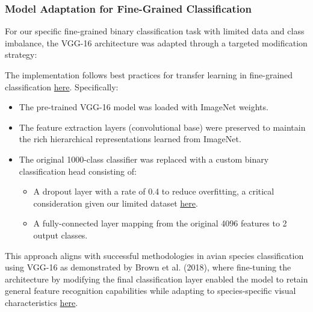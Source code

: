 \documentclass[a4paper,12pt]{article}
\begin{document}
\subsubsection{Model Adaptation for Fine-Grained Classification}
For our specific fine-grained binary classification task with limited data and class imbalance, the VGG-16 architecture was adapted through a targeted modification strategy:



The implementation follows best practices for transfer learning in fine-grained classification \href{https://openaccess.thecvf.com/content_CVPR_2019/papers/Kornblith_Do_Better_ImageNet_Models_Transfer_Better_CVPR_2019_paper.pdf}{here}. Specifically:
\begin{itemize}
    \item The pre-trained VGG-16 model was loaded with ImageNet weights.
    \item The feature extraction layers (convolutional base) were preserved to maintain the rich hierarchical representations learned from ImageNet.
    \item The original 1000-class classifier was replaced with a custom binary classification head consisting of: 
    \begin{itemize}
        \item A dropout layer with a rate of 0.4 to reduce overfitting, a critical consideration given our limited dataset \href{https://www.jmlr.org/papers/volume15/srivastava14a/srivastava14a.pdf}{here}.
        \item A fully-connected layer mapping from the original 4096 features to 2 output classes.
    \end{itemize}
\end{itemize}

This approach aligns with successful methodologies in avian species classification using VGG-16 as demonstrated by Brown et al. (2018), where fine-tuning the architecture by modifying the final classification layer enabled the model to retain general feature recognition capabilities while adapting to species-specific visual characteristics \href{https://ieeexplore.ieee.org/stamp/stamp.jsp?tp=&arnumber=10533638&tag=}{here}.
\end{document}
